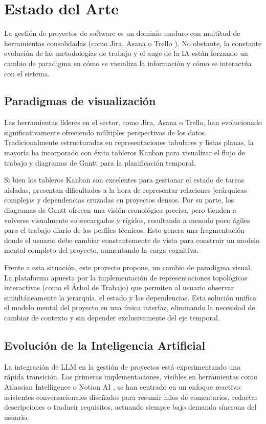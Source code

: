 \section{Estado del Arte}

La gestión de proyectos de software es un dominio maduro con multitud de herramientas consolidadas (como Jira, Asana o Trello \cite{trello_software}). No obstante, la constante evolución de las metodologías de trabajo y el auge de la \ac{IA} están forzando un cambio de paradigma en cómo se visualiza la información y cómo se interactúa con el sistema.

\subsection{Paradigmas de visualización}
Las herramientas líderes en el sector, como Jira, Asana o Trello, han evolucionado significativamente ofreciendo múltiples perspectivas de los datos. Tradicionalmente estructuradas en representaciones tabulares y listas planas, la mayoría ha incorporado con éxito tableros Kanban para visualizar el flujo de trabajo y diagramas de Gantt para la planificación temporal.

Si bien los tableros Kanban son excelentes para gestionar el estado de tareas aisladas, presentan dificultades a la hora de representar relaciones jerárquicas complejas y dependencias cruzadas en proyectos densos. Por su parte, los diagramas de Gantt ofrecen una visión cronológica precisa, pero tienden a volverse visualmente sobrecargados y rígidos, resultando a menudo poco ágiles para el trabajo diario de los perfiles técnicos. Esto genera una fragmentación donde el usuario debe cambiar constantemente de vista para construir un modelo mental completo del proyecto, aumentando la carga cognitiva. 

Frente a esta situación, este proyecto propone, un cambio de paradigma visual. La plataforma apuesta por la implementación de representaciones topológicas interactivas (como el Árbol de Trabajo) que permiten al usuario observar simultáneamente la jerarquía, el estado y las dependencias. Esta solución unifica el modelo mental del proyecto en una única interfaz, eliminando la necesidad de cambiar de contexto y sin depender exclusivamente del eje temporal.

\subsection{Evolución de la Inteligencia Artificial}
La integración de \ac{LLM} en la gestión de proyectos está experimentando una rápida transición. Las primeras implementaciones, visibles en herramientas como Atlassian Intelligence \cite{atlassian_intelligence} o Notion AI \cite{notion_ai}, se han centrado en un enfoque reactivo: asistentes conversacionales diseñados para resumir hilos de comentarios, redactar descripciones o traducir requisitos, actuando siempre bajo demanda síncrona del usuario.

